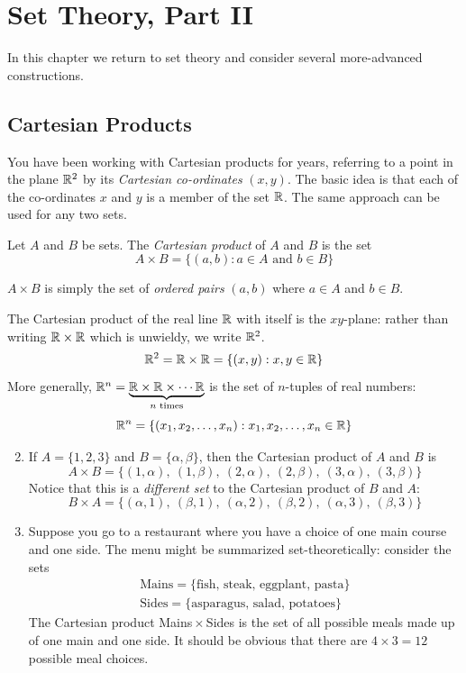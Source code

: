\graphicspath{{6setsii/asy/}}

\section{Set Theory, Part II}\label{chap:sets2}



In this chapter we return to set theory and consider several more-advanced constructions.

\subsection{Cartesian Products}

You have been working with Cartesian products for years, referring to a point in the plane $\mathbb{R}^2$ by its \emph{Cartesian co-ordinates} $(x,y)$. The basic idea is that each of the co-ordinates $x$ and $y$ is a member of the set $\mathbb{R}$. The same approach can be used for any two sets.

\begin{defn}{}{}
	Let $A$ and $B$ be sets. The \emph{Cartesian product} of $A$ and $B$ is the set
	\[
		A\times B=\{(a,b):a\in A\text{ and }b\in B\}
	\]
\end{defn}

 $A\times B$ is simply the set of \emph{ordered pairs} $(a,b)$ where $a\in A$ and $b\in B$.

\begin{examples}{}{}
	\exstart The Cartesian product of the real line $\mathbb{R}$ with itself is the $xy$-plane: rather than writing $\mathbb{R}\times\mathbb{R}$ which is unwieldy, we write $\mathbb{R}^2$.
	\[
		\mathbb{R}^2=\mathbb{R}\times\mathbb{R}=\{(x,y):x,y\in\mathbb{R}\}
	\]
	More generally, $\mathbb{R}^n=\underbrace{\mathbb{R}\times\mathbb{R}\times\cdots\mathbb{R}}_{\text{$n$ times}}$ is the set of $n$-tuples of real numbers:
	\[
		\mathbb{R}^n=\{(x_1,x_2,\ldots,x_n):x_1,x_2,\ldots,x_n\in\mathbb{R}\}
	\]
	\begin{enumerate}\setcounter{enumi}{1}
		\item If $A=\{1,2,3\}$ and $B=\{\alpha,\beta\}$, then the Cartesian product of $A$ and $B$ is
		\[
			A\times B=\{(1,\alpha),\ (1,\beta),\ (2,\alpha),\ (2,\beta),\ (3,\alpha),\ (3,\beta)\}
		\]
		Notice that this is a \emph{different set} to the Cartesian product of $B$ and $A$:
		\[
			B\times A=\{(\alpha,1),\ (\beta,1),\ (\alpha,2),\ (\beta,2),\ (\alpha,3),\ (\beta,3)\}
		\]
		\item Suppose you go to a restaurant where you have a choice of one main course and one side. The menu might be summarized set-theoretically: consider the sets
		\begin{gather*}
			\text{Mains}=\{\text{fish, steak, eggplant, pasta}\}\\
			\text{Sides}=\{\text{asparagus, salad, potatoes}\}
		\end{gather*}
		The Cartesian product Mains\,$\times$\,Sides is the set of all possible meals made up of one main and one side. It should be obvious that there are $4\times 3=12$ possible meal choices.
	\end{enumerate}
\end{examples}

